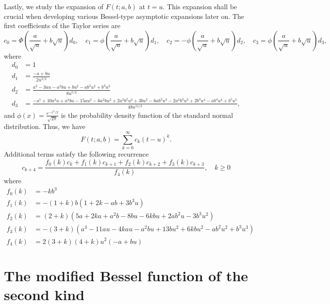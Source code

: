 \documentclass[10pt,a4paper,oneside]{article}
\numberwithin{equation}{section}
\begin{document}
Lastly, we study the expansion of $F(t;a,b)$ at $t=u$. This expansion shall be crucial when developing various Bessel-type asymptotic expansions later on. The first coefficients of the Taylor series are
\begin{equation*}
c_0 = \Phi\left(\frac{a}{\sqrt{u}} + b\sqrt{u}\right)d_0,\quad c_1 = \phi\left(\frac{a}{\sqrt{u}} + b\sqrt{u}\right) d_1, \quad c_2 = -\phi\left(\frac{a}{\sqrt{u}} + b\sqrt{u}\right) d_2, \quad
c_3 = \phi\left(\frac{a}{\sqrt{u}} + b\sqrt{u}\right) d_3,
\end{equation*}
where
\begin{align*}
d_0 &= 1\\
d_1 &= \frac{-a + bu}{2u^{3/2}}\\
d_2 &=\frac{a^3 -3au -a^2 bu + bu^2 -ab^2 u^2 + b^3u^3}{8 u^{7/2}}\\
d_3 &= \frac{-a^5 +10a^3u + a^4bu -15au^2 - 6a^2bu^2 + 2a^3 b^2 u^2 +3bu^3 -6ab^2u^3 - 2a^2b^3 u^3 + 2b^3 u^4 -ab^4u^4 + b^5 u^5}{48 u^{11/2}},
\end{align*}
and $\phi(x) = \frac{e^{-x^2/2}}{\sqrt{2\pi}}$ is the probability density function of the standard normal distribution. Thus, we have
\begin{equation}\label{phi_expansion_at_u}
F(t; a, b) = \sum_{k=0}^{\infty} c_k (t-u)^k.
\end{equation}
Additional terms satisfy the following recurrence
\begin{equation}
c_{k+4} = \frac{f_0(k) c_k + f_1(k) c_{k+1} + f_2(k) c_{k+2} + f_3(k) c_{k+3}}{f_4(k)}, \quad k \ge 0
\end{equation}
where
\begin{align*}
f_0(k) &= -kb^3\\
f_1(k) &= -(1 + k) b (1 + 2k -ab + 3b^3u)\\
f_2(k) &= (2 + k)(5a + 2ka +a^2b - 8bu - 6kbu +2ab^2u -3b^3u^2)\\
f_3(k) &= -(3 + k)(a^3 - 11au -4kau - a^2bu + 13bu^2 + 6kbu^2 -ab^2u^2 + b^3 u^3)\\
f_4(k) &= 2 (3 + k) (4 + k) u^2 (-a + bu)
\end{align*}

\section{The modified Bessel function of the second kind}




\end{document}
